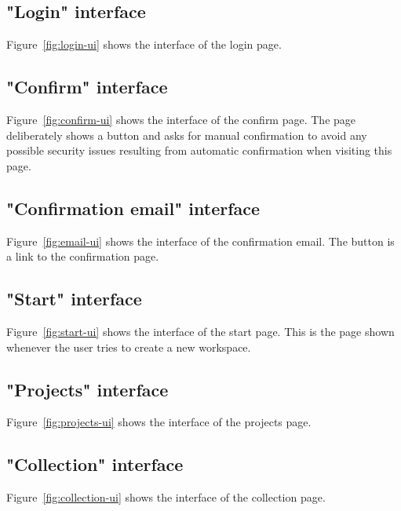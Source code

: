 \subsection{"Login" interface}
Figure~\ref{fig:login-ui} shows the interface of the login page.



\subsection{"Confirm" interface}
Figure~\ref{fig:confirm-ui} shows the interface of the confirm page.
The page deliberately shows a button and asks for manual confirmation to avoid any possible security issues resulting from automatic confirmation when visiting this page.



\subsection{"Confirmation email" interface}
Figure~\ref{fig:email-ui} shows the interface of the confirmation email.
The button is a link to the confirmation page.



\subsection{"Start" interface}
Figure~\ref{fig:start-ui} shows the interface of the start page.
This is the page shown whenever the user tries to create a new workspace.



\subsection{"Projects" interface}
Figure~\ref{fig:projects-ui} shows the interface of the projects page.



\subsection{"Collection" interface}
Figure~\ref{fig:collection-ui} shows the interface of the collection page.



